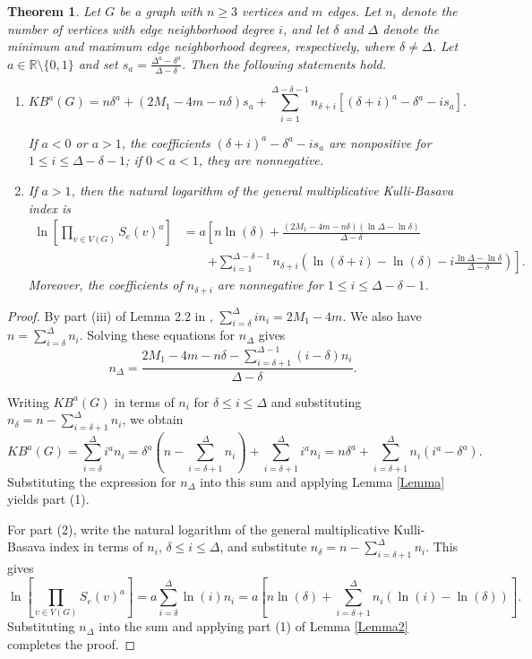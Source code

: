 \documentclass[11pt, oneside]{amsart}   	%
\newtheorem{theorem}{Theorem}[section]
\theoremstyle{definition}
\theoremstyle{remark}
\numberwithin{equation}{section}
\begin{document}
\begin{theorem}\label{Theorem1}
Let $G$ be a graph with $n\geq 3$ vertices and $m$ edges. Let $n_i$ denote the number of vertices with edge neighborhood degree $i$, and let $\delta$ and $\Delta$ denote the minimum and maximum edge neighborhood degrees, respectively, where $\delta\neq\Delta$. Let $a\in\mathbb{R}\setminus\{0,1\}$ and set $s_a=\frac{\Delta^a-\delta^a}{\Delta-\delta}$. Then the following statements hold.
    \begin{enumerate}
\item 
        \[KB^a(G) = n\delta^a +  (2M_1 - 4m - n\delta)s_a +\sum_{i =1}^{\Delta - \delta - 1}n_{\delta + i} \left[(\delta + i)^a - \delta^a  - is_a\right].\]

If $a<0$ or $a>1$, the coefficients $(\delta+i)^a-\delta^a-is_a$ are nonpositive for $1\leq i\leq\Delta-\delta-1$; if $0<a<1$, they are nonnegative.

\item If $a>1$, then the natural logarithm of the general multiplicative Kulli-Basava index is
\[
\begin{aligned}
\ln\left[\prod_{v\in V(G)}S_e(v)^a\right]
&=a\left[n\ln(\delta)+\frac{(2M_1-4m-n\delta)(\ln\Delta-\ln\delta)}{\Delta-\delta}\right.\\
&\qquad\left.+\sum_{i=1}^{\Delta-\delta-1}n_{\delta+i}\left(\ln(\delta+i)-\ln(\delta)-i\frac{\ln\Delta-\ln\delta}{\Delta-\delta}\right)\right].
\end{aligned}
\]
Moreover, the coefficients of $n_{\delta+i}$ are nonnegative for $1\leq i\leq\Delta-\delta-1$.
\end{enumerate} 
\end{theorem}
\begin{proof}

By part (iii) of Lemma 2.2 in \cite{basavanagoud2019kulli}, $\sum_{i=\delta}^\Delta i n_i=2M_1-4m$. We also have $n=\sum_{i=\delta}^\Delta n_i$. Solving these equations for $n_\Delta$ gives
\[
n_\Delta=\frac{2M_1 - 4m - n\delta - \sum_{i=\delta + 1}^{\Delta  - 1}(i - \delta)n_i}{\Delta - \delta}.
\]

Writing $KB^a(G)$ in terms of $n_i$ for $\delta\leq i\leq\Delta$ and substituting $n_\delta=n-\sum_{i=\delta+1}^\Delta n_i$, we obtain
\[
KB^a(G) = \sum_{i=\delta}^\Delta  i^a n_i = \delta^a\left( n - \sum_{i= \delta + 1}^\Delta n_i\right) + \sum_{i=\delta + 1}^\Delta  i^a n_i = n\delta^a + \sum_{i = \delta + 1}^\Delta  n_i(i^a - \delta^a).
\]
Substituting the expression for $n_\Delta$ into this sum and applying Lemma \ref{Lemma} yields part (1).

For part (2), write the natural logarithm of the general multiplicative Kulli-Basava index in terms of $n_i$, $\delta\leq i\leq\Delta$, and substitute $n_\delta=n-\sum_{i=\delta+1}^\Delta n_i$. This gives
\[
\ln\left[\prod_{v\in V(G)}S_e(v)^a\right]=a\sum_{i=\delta}^\Delta \ln(i)n_i=a\left[n\ln(\delta)+\sum_{i=\delta+1}^\Delta n_i(\ln(i)-\ln(\delta))\right].
\]
Substituting $n_\Delta$ into the sum and applying part (1) of Lemma \ref{Lemma2} completes the proof.

\end{proof}
\end{document}
